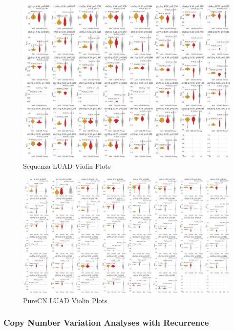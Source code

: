 \documentclass[11pt,a4paper,onecolumn,oneside]{report}
\begin{document}
                \begin{figure}[p]
                    \centering
                    \includegraphics[width=\linewidth]{figures/Sequenza/BWA-violin-ADC.pdf}
                    \caption{Sequenza LUAD Violin Plots}
                    \label{fig:sequenza-ADC-violin}
                \end{figure}

                \begin{figure}[p]
                    \centering
                    \includegraphics[width=\linewidth]{figures/PureCN/BWA-violin-ADC.pdf}
                    \caption{PureCN LUAD Violin Plots}
                    \label{fig:PureCN-ADC-violin}
                \end{figure}

            \subsubsection{Copy Number Variation Analyses with Recurrence}
\end{document}
